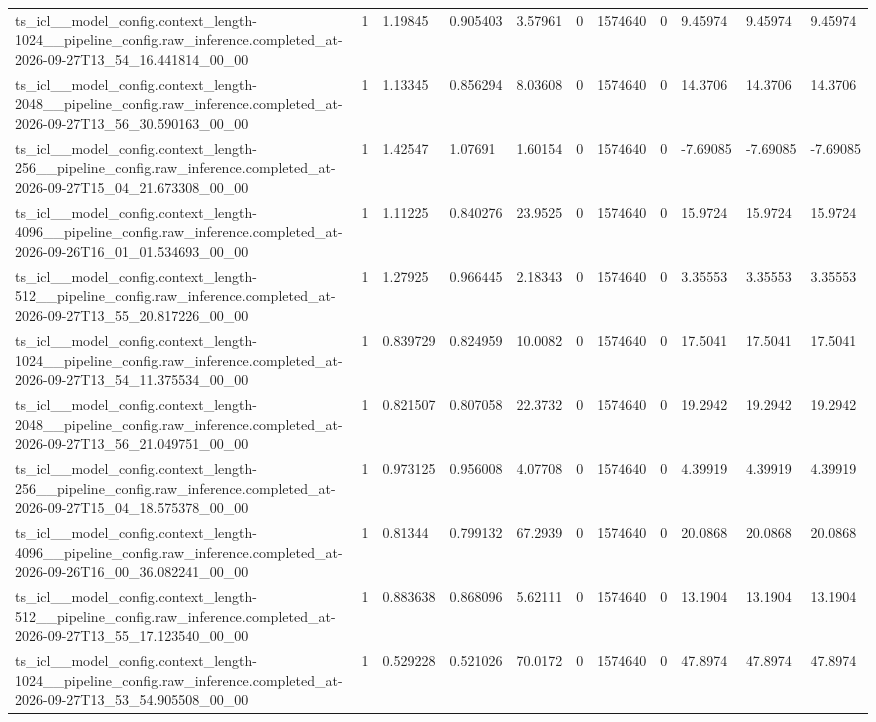 \begin{tabular}{lllllllllll}
ts\_icl\_\_model\_config.context\_length-1024\_\_pipeline\_config.raw\_inference.completed\_at-2026-09-27T13\_54\_16.441814\_00\_00 & 1 & 1.19845 & 0.905403 & 3.57961 & 0 & 1574640 & 0 & 9.45974 & 9.45974 & 9.45974 \\
ts\_icl\_\_model\_config.context\_length-2048\_\_pipeline\_config.raw\_inference.completed\_at-2026-09-27T13\_56\_30.590163\_00\_00 & 1 & 1.13345 & 0.856294 & 8.03608 & 0 & 1574640 & 0 & 14.3706 & 14.3706 & 14.3706 \\
ts\_icl\_\_model\_config.context\_length-256\_\_pipeline\_config.raw\_inference.completed\_at-2026-09-27T15\_04\_21.673308\_00\_00 & 1 & 1.42547 & 1.07691 & 1.60154 & 0 & 1574640 & 0 & -7.69085 & -7.69085 & -7.69085 \\
ts\_icl\_\_model\_config.context\_length-4096\_\_pipeline\_config.raw\_inference.completed\_at-2026-09-26T16\_01\_01.534693\_00\_00 & 1 & 1.11225 & 0.840276 & 23.9525 & 0 & 1574640 & 0 & 15.9724 & 15.9724 & 15.9724 \\
ts\_icl\_\_model\_config.context\_length-512\_\_pipeline\_config.raw\_inference.completed\_at-2026-09-27T13\_55\_20.817226\_00\_00 & 1 & 1.27925 & 0.966445 & 2.18343 & 0 & 1574640 & 0 & 3.35553 & 3.35553 & 3.35553 \\
ts\_icl\_\_model\_config.context\_length-1024\_\_pipeline\_config.raw\_inference.completed\_at-2026-09-27T13\_54\_11.375534\_00\_00 & 1 & 0.839729 & 0.824959 & 10.0082 & 0 & 1574640 & 0 & 17.5041 & 17.5041 & 17.5041 \\
ts\_icl\_\_model\_config.context\_length-2048\_\_pipeline\_config.raw\_inference.completed\_at-2026-09-27T13\_56\_21.049751\_00\_00 & 1 & 0.821507 & 0.807058 & 22.3732 & 0 & 1574640 & 0 & 19.2942 & 19.2942 & 19.2942 \\
ts\_icl\_\_model\_config.context\_length-256\_\_pipeline\_config.raw\_inference.completed\_at-2026-09-27T15\_04\_18.575378\_00\_00 & 1 & 0.973125 & 0.956008 & 4.07708 & 0 & 1574640 & 0 & 4.39919 & 4.39919 & 4.39919 \\
ts\_icl\_\_model\_config.context\_length-4096\_\_pipeline\_config.raw\_inference.completed\_at-2026-09-26T16\_00\_36.082241\_00\_00 & 1 & 0.81344 & 0.799132 & 67.2939 & 0 & 1574640 & 0 & 20.0868 & 20.0868 & 20.0868 \\
ts\_icl\_\_model\_config.context\_length-512\_\_pipeline\_config.raw\_inference.completed\_at-2026-09-27T13\_55\_17.123540\_00\_00 & 1 & 0.883638 & 0.868096 & 5.62111 & 0 & 1574640 & 0 & 13.1904 & 13.1904 & 13.1904 \\
ts\_icl\_\_model\_config.context\_length-1024\_\_pipeline\_config.raw\_inference.completed\_at-2026-09-27T13\_53\_54.905508\_00\_00 & 1 & 0.529228 & 0.521026 & 70.0172 & 0 & 1574640 & 0 & 47.8974 & 47.8974 & 47.8974 \\

\end{tabular}
